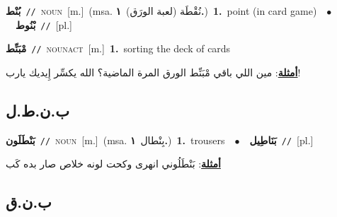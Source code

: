 \documentclass[10pt,a4paper,twoside]{article} %
\begin{document}
\begin{multicols}{2}
{\setlength\topsep{0pt}\textbf{\foreignlanguage{arabic}{بُنْط}}\ {\color{gray}\texttt{//}\color{black}}\ \textsc{noun}\ [m.]\ \color{gray}(msa. \foreignlanguage{arabic}{نُقْطَة (لعبة الورَق)}~\foreignlanguage{arabic}{\textbf{١.}})\color{black}\ \textbf{1.}~point (in card game)\ \ $\bullet$\ \ \setlength\topsep{0pt}\textbf{\foreignlanguage{arabic}{بْنُوط}}\ {\color{gray}\texttt{//}\color{black}}\ [pl.]\ } \vspace{2mm}

{\setlength\topsep{0pt}\textbf{\foreignlanguage{arabic}{مْبَنِّط}}\ {\color{gray}\texttt{//}\color{black}}\ \textsc{noun\textunderscore act}\ [m.]\ \textbf{1.}~sorting the deck of cards\  \begin{flushright}\color{gray}\foreignlanguage{arabic}{\textbf{\underline{\foreignlanguage{arabic}{أمثلة}}}: مين اللي باقي مْبَنِّط الورق المرة الماضية؟ الله يكسِّر إِيديك يارب!}\end{flushright}\color{black}} \vspace{2mm}

\vspace{-3mm}
\subsection*{\color{blue}\foreignlanguage{arabic}{ب.ن.ط.ل}\color{blue}{}} 

{\setlength\topsep{0pt}\textbf{\foreignlanguage{arabic}{بَنْطَلَون}}\ {\color{gray}\texttt{//}\color{black}}\ \textsc{noun}\ [m.]\ \color{gray}(msa. \foreignlanguage{arabic}{بِنْطال}~\foreignlanguage{arabic}{\textbf{١.}})\color{black}\ \textbf{1.}~trousers\ \ $\bullet$\ \ \setlength\topsep{0pt}\textbf{\foreignlanguage{arabic}{بَنَاطِيل}}\ {\color{gray}\texttt{//}\color{black}}\ [pl.]\  \begin{flushright}\color{gray}\foreignlanguage{arabic}{\textbf{\underline{\foreignlanguage{arabic}{أمثلة}}}: بَنْطَلُوني انهرى وكحت لونه خلاص صار بده كَب}\end{flushright}\color{black}} \vspace{2mm}

\vspace{-3mm}
\subsection*{\color{blue}\foreignlanguage{arabic}{ب.ن.ق}\color{blue}{}} 


\end{multicols}
\end{document}

